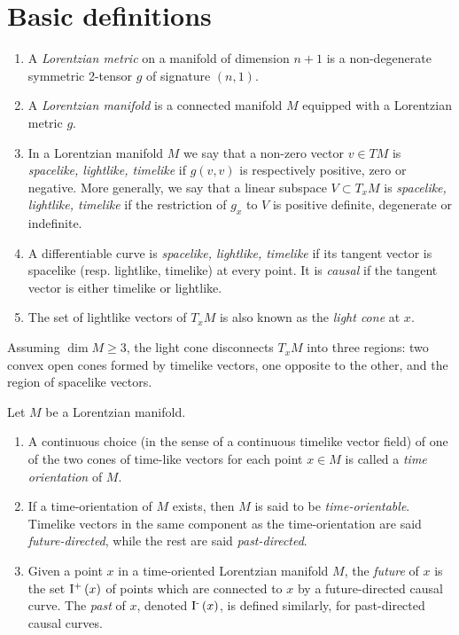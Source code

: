 \documentclass{report}
\begin{document}
\section{Basic definitions}
\begin{definition}
    \begin{enumerate}[label=(\roman*)]
        \item A \emph{Lorentzian metric} on a manifold of dimension $n+1$  is a non-degenerate symmetric 2-tensor $g$ of signature $(n,1)$. 
        \item A \emph{Lorentzian manifold} is a connected manifold $M$ equipped with a Lorentzian metric $g$.
        \item In a Lorentzian manifold $M$ we say that a non-zero vector $v\in TM$ is \emph{spacelike, lightlike, timelike} if $g(v,v)$ is respectively positive, zero or negative. More generally, we say that a linear subspace $V\subset T_x M$ is \emph{spacelike, lightlike, timelike} if the restriction of $g_x$ to $V$ is positive definite, degenerate or indefinite.
        \item A differentiable curve is \emph{spacelike, lightlike, timelike} if its tangent vector is spacelike (resp. lightlike, timelike) at every point. It is \emph{causal} if the tangent vector is either timelike or lightlike.
        \item The set of lightlike vectors of $T_x M$ is also known as the \emph{light cone} at $x$.
    \end{enumerate}
\end{definition}

Assuming $\dim M \geq 3$, the light cone disconnects $T_x M$ into three regions: two convex open cones formed by timelike vectors, one opposite to the other, and the region of spacelike vectors.
\begin{definition}
    Let $M$ be a Lorentzian manifold.
    \begin{enumerate}[label=(\roman*)]
        \item A continuous choice (in the sense of a continuous timelike vector field) of one of the two cones of time-like vectors for each point $x\in M$ is called a \emph{time orientation} of $M$.
        \item If a time-orientation of $M$ exists, then $M$ is said to be \emph{time-orientable}.
        Timelike vectors in the same component as the time-orientation are said \emph{future-directed}, while the rest are said \emph{past-directed}.
        \item Given a point $x$ in a time-oriented Lorentzian manifold $M$, the \emph{future} of $x$ is the set $\operatorname{\mathrm{I}^+}{(x)}$ of points which are connected to $x$ by a future-directed causal curve. The \emph{past} of $x$, denoted $\operatorname{\mathrm{I}^-}{(x)}$, is defined similarly, for past-directed causal curves.
    \end{enumerate}
\end{definition}
\end{document}
